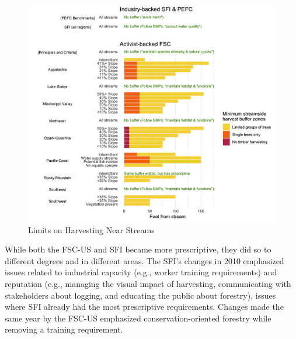 \documentclass[
      12pt,
            Review ]{article}
\begin{document}
\begin{figure}
\centering
\includegraphics{Figs/riparian-1.png}
\caption{Limits on Harvesting Near Streams}
\end{figure}



While both the FSC-US and SFI became more prescriptive, they did so to
different degrees and in different areas. The SFI's changes in 2010
emphasized issues related to industrial capacity (e.g., worker training
requirements) and reputation (e.g., managing the visual impact of
harvesting, communicating with stakeholders about logging, and educating
the public about forestry), issues where SFI already had the most
prescriptive requirements. Changes made the same year by the FSC-US
emphasized conservation-oriented forestry while removing a training
requirement.
\end{document}
